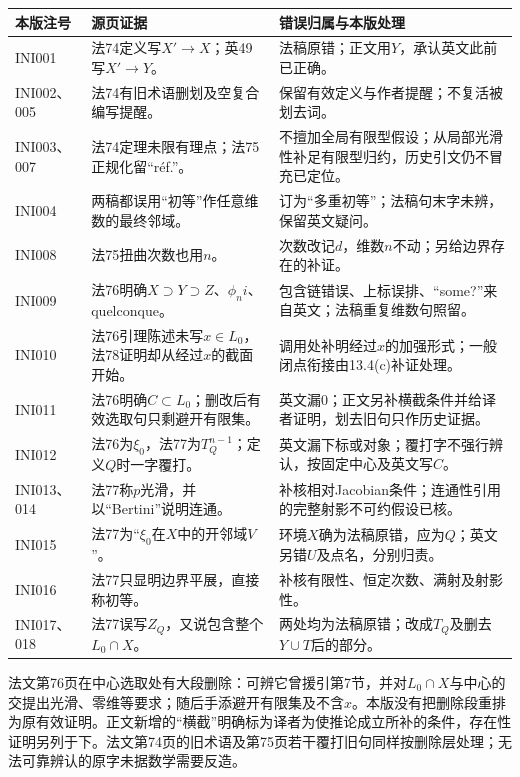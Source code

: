 \begin{longtable}{@{}p{.17\linewidth}p{.35\linewidth}p{.39\linewidth}@{}}
\toprule
本版注号 & 源页证据 & 错误归属与本版处理\\
\midrule
\endhead
INI001 & 法74定义写$X'\to X$；英49写$X'\to Y$。 & 法稿原错；正文用$Y$，承认英文此前已正确。\\
INI002、005 & 法74有旧术语删划及空复合编写提醒。 & 保留有效定义与作者提醒；不复活被划去词。\\
INI003、007 & 法74定理未限有理点；法75正规化留“r\'ef.”。 & 不擅加全局有限型假设；从局部光滑性补足有限型归约，历史引文仍不冒充已定位。\\
INI004 & 两稿都误用“初等”作任意维数的最终邻域。 & 订为“多重初等”；法稿句末字未辨，保留英文疑问。\\
INI008 & 法75扭曲次数也用$n$。 & 次数改记$d$，维数$n$不动；另给边界存在的补证。\\
INI009 & 法76明确$X\supset Y\supset Z$、$\phi_n i$、quelconque。 & 包含链错误、上标误排、“some?”来自英文；法稿重复维数句照留。\\
INI010 & 法76引理陈述未写$x\in L_0$，法78证明却从经过$x$的截面开始。 & 调用处补明经过$x$的加强形式；一般闭点衔接由13.4(c)补证处理。\\
INI011 & 法76明确$C\subset L_0$；删改后有效选取句只剩避开有限集。 & 英文漏0；正文另补横截条件并给译者证明，划去旧句只作历史证据。\\
INI012 & 法76为$\xi_0$，法77为$T_Q^{n-1}$；定义$Q$时一字覆打。 & 英文漏下标或对象；覆打字不强行辨认，按固定中心及英文写$C$。\\
INI013、014 & 法77称$p$光滑，并以“Bertini”说明连通。 & 补核相对Jacobian条件；连通性引用的完整射影不可约假设已核。\\
INI015 & 法77为“$\xi_0$在$X$中的开邻域$V$”。 & 环境$X$确为法稿原错，应为$Q$；英文另错$U$及点名，分别归责。\\
INI016 & 法77只显明边界平展，直接称初等。 & 补核有限性、恒定次数、满射及射影性。\\
INI017、018 & 法77误写$Z_Q$，又说包含整个$L_0\cap X$。 & 两处均为法稿原错；改成$T_Q$及删去$Y\cup T$后的部分。\\
\bottomrule
\end{longtable}

法文第76页在中心选取处有大段删除：可辨它曾援引第7节，并对$L_0\cap X$与中心的交提出光滑、零维等要求；随后手添避开有限集及不含$x$。本版没有把删除段重排为原有效证明。正文新增的“横截”明确标为译者为使推论成立所补的条件，存在性证明另列于下。法文第74页的旧术语及第75页若干覆打旧句同样按删除层处理；无法可靠辨认的原字未据数学需要反造。

